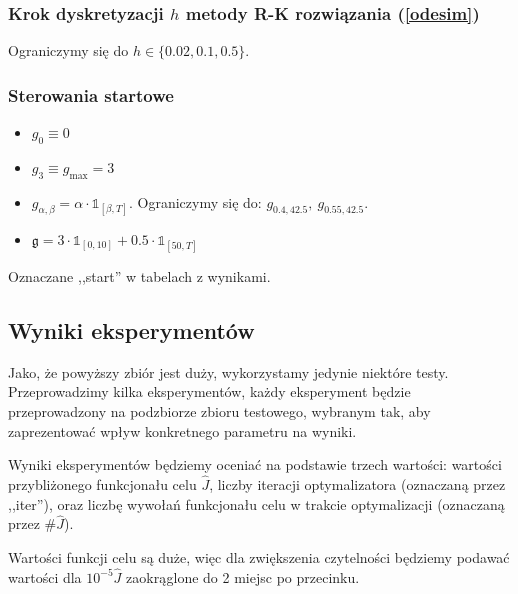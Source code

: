 \documentclass[11pt]{article}
\def\1{\mathds{1}}
\begin{document}
\subsubsection{Krok dyskretyzacji $h$ metody R-K rozwiązania (\ref{odesim})}
Ograniczymy się do $h \in \{0.02, 0.1, 0.5\}$.
\subsubsection{Sterowania startowe}
\begin{itemize}
\item $g_0\equiv 0$
\item $g_{3} \equiv g_{\max} = 3$
\item $g_{\alpha,\beta} = \alpha \cdot \1_{[\beta, T]}$. Ograniczymy się do: $g_{0.4,42.5},\ g_{0.55,42.5}$.
\item $\mathfrak{g} = 3 \cdot \1_{[0,10]} + 0.5 \cdot \1_{[50, T]}$
\end{itemize}
Oznaczane ,,start'' w tabelach z wynikami.

\subsection{Wyniki eksperymentów}
Jako, że powyższy zbiór jest duży, wykorzystamy jedynie niektóre testy. Przeprowadzimy kilka eksperymentów, każdy eksperyment będzie przeprowadzony na podzbiorze zbioru testowego, wybranym tak, aby zaprezentować wpływ konkretnego parametru na wyniki.

Wyniki eksperymentów będziemy oceniać na podstawie trzech wartości: wartości przybliżonego funkcjonału celu $\hat{J}$, liczby iteracji optymalizatora (oznaczaną przez ,,iter''), oraz liczbę wywołań funkcjonału celu w trakcie optymalizacji (oznaczaną przez $\#\hat{J}$).

Wartości funkcji celu są duże, więc dla zwiększenia czytelności będziemy podawać wartości dla $10^{-5}\hat{J}$ zaokrąglone do 2 miejsc po przecinku.
\end{document}
